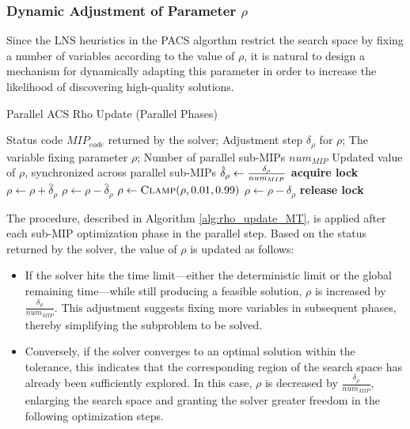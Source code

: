 \subsubsection{Dynamic Adjustment of Parameter $\rho$}
Since the LNS heuristics in the PACS algorthm restrict the search space by fixing a number of variables according to the value of $\rho$, it is natural to design a mechanism for dynamically adapting this parameter in order to increase the likelihood of discovering high-quality solutions.  
\begin{algorithm}[H]
\caption{Parallel ACS Rho Update (Parallel Phases)}\label{alg:rho_update_MT}
\begin{algorithmic}[1]
\Require Status code $MIP_{code}$ returned by the solver; Adjustment step $\delta_\rho$ for $\rho$; The variable fixing parameter $\rho$; Number of parallel sub-MIPs $num_{MIP}$
\Ensure Updated value of $\rho$, synchronized across parallel sub-MIPs
    \State $\hat\delta_\rho \gets {\delta_\rho \over{num_{MIP}}}$
    \State \textbf{acquire lock}
        \State $\rho \gets \rho + \hat\delta_\rho$
    \EndIf
        \State $\rho \gets \rho - \hat\delta_\rho$
    \EndIf
    \State $\rho \gets \Call{Clamp}{\rho,0.01,0.99}$
        \State $\rho \gets \rho - \delta_\rho$
    \EndIf
    \State \textbf{release lock}
\EndFunction
\end{algorithmic}
\end{algorithm}
The procedure, described in Algorithm \ref{alg:rho_update_MT}, is applied after each sub-MIP optimization phase in the parallel step. Based on the status returned by the solver, the value of $\rho$ is updated as follows:
\begin{itemize}
    \item  If the solver hits the time limit—either the deterministic limit or the global remaining time—while still producing a feasible solution, $\rho$ is increased by $\frac{\delta_\rho}{num_{MIP}}$. This adjustment suggests fixing more variables in subsequent phases, thereby simplifying the subproblem to be solved. 
    \item Conversely, if the solver converges to an optimal solution within the tolerance, this indicates that the corresponding region of the search space has already been sufficiently explored. In this case, $\rho$ is decreased by $\frac{\delta_\rho}{num_{MIP}}$, enlarging the search space and granting the solver greater freedom in the following optimization steps.  
\end{itemize}

